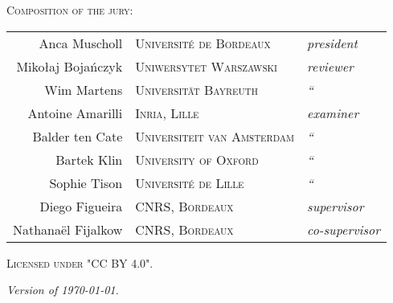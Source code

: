 \newpage
\thispagestyle{empty}
~
\newpage
\thispagestyle{empty}
\begin{fullwidth}
	\setlength{\parindent}{0pt}
	~\vfill
	\begin{center}
		\normalfont\Large\scshape Composition of the jury:\\[1.5em]
		\normalfont
		\begin{tabular}{r@{\hskip 1em}l@{\hskip 1em}l}
		  Anca Muscholl & \textsc{\small Université de Bordeaux} & \emph{president}\\[.5em]
		  Mikołaj Bojańczyk & \textsc{\small Uniwersytet Warszawski} & \emph{reviewer}\\
		  Wim Martens & \textsc{\small Universität Bayreuth} & \emph{\hphantom{revi}``} \\[.5em]
		  Antoine Amarilli & \textsc{\small Inria, Lille} & \emph{examiner}\\
		  Balder ten Cate & \textsc{\small Universiteit van Amsterdam} & \emph{\hphantom{revi}``}\\
		  Bartek Klin & \textsc{\small University of Oxford} & \emph{\hphantom{revi}``}\\
		  Sophie Tison & \textsc{\small Université de Lille} & \emph{\hphantom{revi}``}\\[.5em]
		  Diego Figueira & \textsc{\small CNRS, Bordeaux} & \emph{supervisor}\\
		  Nathanaël Fijalkow & \textsc{\small CNRS, Bordeaux} & \emph{co-supervisor}
		\end{tabular}
	\end{center}

	\vfill

	\par\textsc{Licensed under "CC BY 4.0".}
	\par\textit{Version of \today.}
\end{fullwidth}